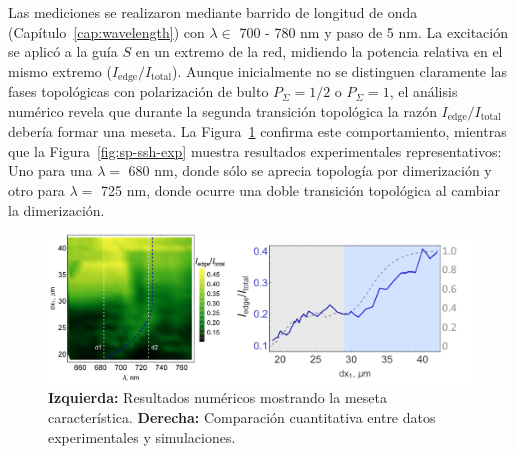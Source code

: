 Las mediciones se realizaron mediante barrido de longitud de onda (Capítulo~\ref{cap:wavelength}) con $\lambda \in$ 700 - 780 nm y paso de 5 nm. La excitación se aplicó a la guía $S$ en un extremo de la red, midiendo la potencia relativa en el mismo extremo ($I_{\text{edge}}/I_{\text{total}}$). Aunque inicialmente no se distinguen claramente las fases topológicas con polarización de bulto $P_\Sigma=1/2$ o $P_\Sigma=1$, el análisis numérico revela que durante la segunda transición topológica la razón $I_{\text{edge}}/I_{\text{total}}$ debería formar una meseta. La Figura~\ref{fig:sp-ssh-num} confirma este comportamiento, mientras que la Figura~\ref{fig:sp-ssh-exp} muestra resultados experimentales representativos: Uno para una $\lambda =$ 680 nm, donde sólo se aprecia topología por dimerización y otro para $\lambda =$ 725 nm, donde ocurre una doble transición topológica al cambiar la dimerización.

\begin{figure}[H]
	\centering
	\includegraphics[width=0.9\linewidth]{media/sp-ssh-exp-num.png}
	\caption[Análisis numérico-experimental del modelo SP-SSH]{
		\textbf{Izquierda:} Resultados numéricos mostrando la meseta característica. 
		\textbf{Derecha:} Comparación cuantitativa entre datos experimentales y simulaciones.
		\label{fig:sp-ssh-num}}
\end{figure}

